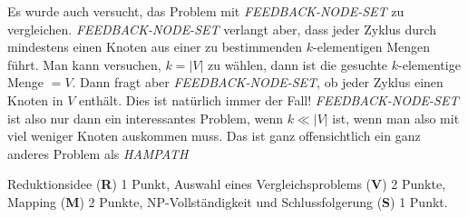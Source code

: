 \begin{diskussion}
Es wurde auch versucht, das Problem mit {\sl FEEDBACK-NODE-SET} zu vergleichen.
{\sl FEEDBACK-NODE-SET} verlangt aber, dass jeder Zyklus durch mindestens einen
Knoten aus einer zu bestimmenden $k$-elementigen Mengen führt. 
Man kann versuchen, $k=|V|$ zu wählen, dann ist die gesuchte $k$-elementige
Menge $=V$.
Dann fragt aber {\sl FEEDBACK-NODE-SET}, ob jeder Zyklus einen Knoten in $V$
enthält. 
Dies ist natürlich immer der Fall!
{\sl FEEDBACK-NODE-SET} ist also nur dann ein interessantes Problem,
wenn $k\ll |V|$
ist, wenn man also mit viel weniger Knoten auskommen muss.
Das ist ganz offensichtlich ein ganz anderes Problem als {\sl HAMPATH}
\end{diskussion}

\begin{bewertung}
Reduktionsidee ({\bf R}) 1 Punkt,
Auswahl eines Vergleichsproblems ({\bf V}) 2 Punkte,
Mapping ({\bf M}) 2 Punkte,
NP-Vollständigkeit und Schlussfolgerung ({\bf S}) 1 Punkt.
\end{bewertung}
